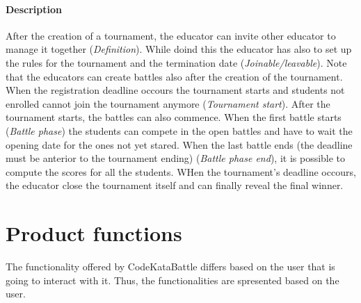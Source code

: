 \documentclass[12pt, a4paper]{report}
\begin{document}
    \paragraph*{Description}
    After the creation of a tournament, the educator can invite other educator to manage it together (\textit{Definition}). 
    While doind this the educator has also to set up the rules for the tournament and the termination date (\textit{Joinable/leavable}).
    Note that the educators can create battles also after the creation of the tournament.
    When the registration deadline occours the tournament starts and students not enrolled cannot join the tournament anymore (\textit{Tournament start}). 
    After the tournament starts, the battles can also commence. 
    When the first battle starts (\textit{Battle phase}) the students can compete in the open battles and have to wait the opening date for the ones not yet stared. 
    When the last battle ends (the deadline must be anterior to the tournament ending) (\textit{Battle phase end}), it is possible to compute the scores for all the students. 
    WHen the tournament's deadline occours, the educator close the tournament itself and can finally reveal the final winner. 

    \section{Product functions}
    The functionality offered by CodeKataBattle differs based on the user that is going to interact with it. 
    Thus, the functionalities are spresented based on the user. 
    
\end{document}
